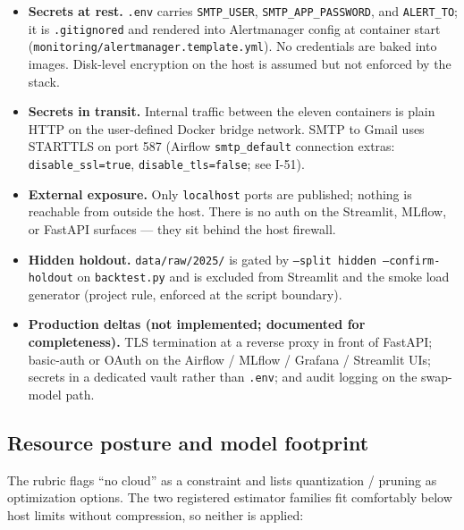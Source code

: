 \documentclass[11pt,a4paper]{article}
\begin{document}
\begin{itemize}[leftmargin=1.5em,itemsep=0pt]
  \item \textbf{Secrets at rest.} \texttt{.env} carries \texttt{SMTP\_USER}, \texttt{SMTP\_APP\_PASSWORD}, and \texttt{ALERT\_TO}; it is \texttt{.gitignored} and rendered into Alertmanager config at container start (\texttt{monitoring/alertmanager.template.yml}). No credentials are baked into images. Disk-level encryption on the host is assumed but not enforced by the stack.
  \item \textbf{Secrets in transit.} Internal traffic between the eleven containers is plain HTTP on the user-defined Docker bridge network. SMTP to Gmail uses STARTTLS on port 587 (Airflow \texttt{smtp\_default} connection extras: \texttt{disable\_ssl=true}, \texttt{disable\_tls=false}; see I-51).
  \item \textbf{External exposure.} Only \texttt{localhost} ports are published; nothing is reachable from outside the host. There is no auth on the Streamlit, MLflow, or FastAPI surfaces --- they sit behind the host firewall.
  \item \textbf{Hidden holdout.} \texttt{data/raw/2025/} is gated by \texttt{--split hidden --confirm-holdout} on \texttt{backtest.py} and is excluded from Streamlit and the smoke load generator (project rule, enforced at the script boundary).
  \item \textbf{Production deltas (not implemented; documented for completeness).} TLS termination at a reverse proxy in front of FastAPI; basic-auth or OAuth on the Airflow / MLflow / Grafana / Streamlit UIs; secrets in a dedicated vault rather than \texttt{.env}; and audit logging on the swap-model path.
\end{itemize}

\subsection{Resource posture and model footprint}\label{sec:resource}
The rubric flags ``no cloud'' as a constraint and lists quantization / pruning as optimization options. The two registered estimator families fit comfortably below host limits without compression, so neither is applied:
\end{document}
